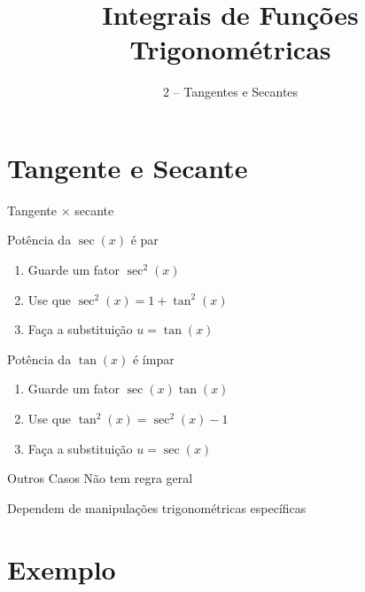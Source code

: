 \documentclass[fleqn,utf8,aspectratio=169,12pt]{beamer}
\title{Integrais de Funções Trigonométricas}
\subtitle{2 -- Tangentes e Secantes}
\begin{document}
\addtitle

\section{Tangente e Secante}

\begin{frame}{Tangente $\times$ secante}
\end{frame}

\begin{frame}{Potência da $\sec(x)$ é par}
  \begin{enumerate}[<+->]
    \setlength\itemsep{1em}
    \item Guarde um fator $\sec^2(x)$
    \item Use que $\sec^2(x) = 1 + \tan^2(x)$
    \item Faça a substituição $u = \tan(x)$
  \end{enumerate}
\end{frame}

\begin{frame}{Potência da $\tan(x)$ é ímpar}
  \begin{enumerate}[<+->]
    \setlength\itemsep{1em}
    \item Guarde um fator $\sec(x)\tan(x)$
    \item Use que $\tan^2(x)=\sec^2(x)-1$
    \item Faça a substituição $u=\sec(x)$
  \end{enumerate}
\end{frame}

\begin{frame}{Outros Casos}
  Não tem regra geral

  Dependem de manipulações trigonométricas específicas
\end{frame}

\addtocounter{exemplo}{1}
\section{Exemplo \theexemplo}
\end{document}
